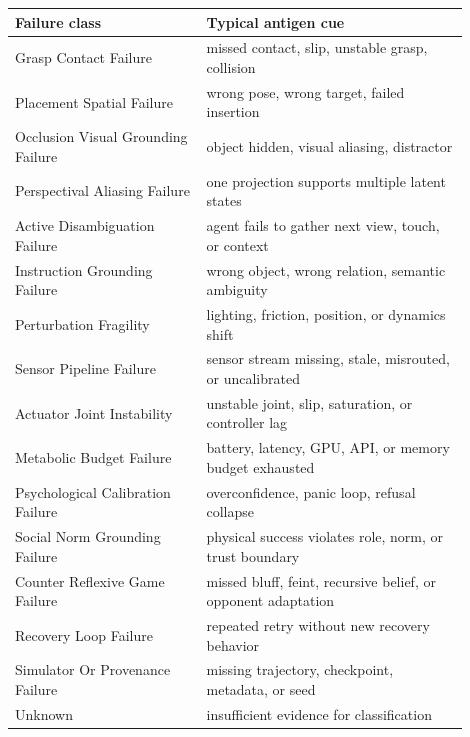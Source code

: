 \begin{tabular}{p{0.38\linewidth}p{0.52\linewidth}}
\toprule
Failure class & Typical antigen cue \\
\midrule
Grasp Contact Failure & missed contact, slip, unstable grasp, collision \\
Placement Spatial Failure & wrong pose, wrong target, failed insertion \\
Occlusion Visual Grounding Failure & object hidden, visual aliasing, distractor \\
Perspectival Aliasing Failure & one projection supports multiple latent states \\
Active Disambiguation Failure & agent fails to gather next view, touch, or context \\
Instruction Grounding Failure & wrong object, wrong relation, semantic ambiguity \\
Perturbation Fragility & lighting, friction, position, or dynamics shift \\
Sensor Pipeline Failure & sensor stream missing, stale, misrouted, or uncalibrated \\
Actuator Joint Instability & unstable joint, slip, saturation, or controller lag \\
Metabolic Budget Failure & battery, latency, GPU, API, or memory budget exhausted \\
Psychological Calibration Failure & overconfidence, panic loop, refusal collapse \\
Social Norm Grounding Failure & physical success violates role, norm, or trust boundary \\
Counter Reflexive Game Failure & missed bluff, feint, recursive belief, or opponent adaptation \\
Recovery Loop Failure & repeated retry without new recovery behavior \\
Simulator Or Provenance Failure & missing trajectory, checkpoint, metadata, or seed \\
Unknown & insufficient evidence for classification \\
\bottomrule
\end{tabular}
